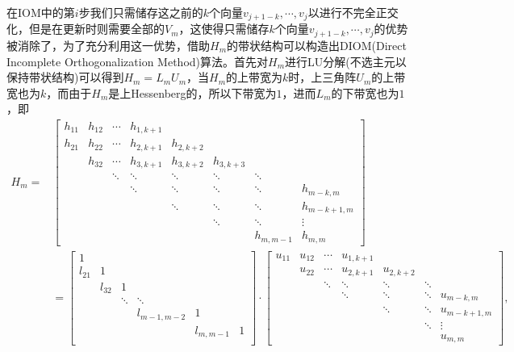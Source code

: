 \documentclass[a4paper,10pt]{ctexart}
\begin{document}
在IOM中的第$ i $步我们只需储存这之前的$ k $个向量$ v_{j+1-k},\cdots ,v_j $以进行不完全正交化，但是在更新时则需要全部的$ V_m $，这使得只需储存$ k $个向量$ v_{j+1-k},\cdots ,v_j $的优势被消除了，为了充分利用这一优势，借助$ H_m $的带状结构可以构造出DIOM(Direct Incomplete Orthogonalization Method)算法。首先对$ H_m $进行LU分解(不选主元以保持带状结构)可以得到$ H_m = L_mU_m $，当$ H_m $的上带宽为$ k $时，上三角阵$ U_m $的上带宽也为$ k $，而由于$ H_m $是上Hessenberg的，所以下带宽为$ 1 $，进而$ L_m $的下带宽也为$ 1 $，即
\[
    \begin{aligned}
        H_m = &
    \begin{bmatrix} 
        h_{11} & h_{12} &\cdots & h_{1,k+1} & & &\\
        h_{21} & h_{22} &\cdots & h_{2,k+1} & h_{2,k+2} & &\\
        & h_{32} &\cdots & h_{3,k+1} & h_{3,k+2} & h_{3,k+3} &\\
        & & \ddots & \ddots & \ddots & \ddots & \ddots\\
        & & & \ddots & \ddots & \ddots & \ddots & h_{m-k,m}\\
        & & & & \ddots & \ddots & \ddots & h_{m-k+1,m}\\
        & & & & & \ddots & \ddots & \vdots \\
        & & & & & & h_{m,m-1} & h_{m,m}
    \end{bmatrix} \\
    &= \begin{bmatrix} 
        1 & & & & &\\
        l_{21} & 1 & & & &\\
        & l_{32} & 1 & & &\\
        & & \ddots & \ddots & &\\
        & & & l_{m-1,m-2} & 1 &\\
        & & & & l_{m,m-1} & 1\\
    \end{bmatrix}\cdot 
    \begin{bmatrix} 
        u_{11} & u_{12} &\cdots & u_{1,k+1} & & &\\
        & u_{22} &\cdots & u_{2,k+1} & u_{2,k+2} & &\\
        & & \ddots & \ddots & \ddots & \ddots &\\
        & & & \ddots & \ddots & \ddots & u_{m-k,m}\\
        & & & & \ddots & \ddots & u_{m-k+1,m}\\
        & & & & & \ddots & \vdots\\
        & & & & & & u_{m,m}
    \end{bmatrix},
    \end{aligned}
\]
\end{document}
